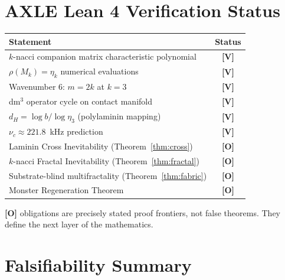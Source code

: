 \documentclass[12pt,a4paper]{article}
\newcommand{\etak}{\eta_k}
\newcommand{\etatrib}{\eta_3}
\begin{document}
\section{AXLE Lean 4 Verification Status}
\label{sec:axle}

\begin{center}
\begin{tabular}{lc}
\toprule
Statement & Status \\
\midrule
$k$-nacci companion matrix characteristic polynomial & \textbf{[V]}\\
$\rho(M_k)=\etak$ numerical evaluations & \textbf{[V]}\\
Wavenumber 6: $m=2k$ at $k=3$ & \textbf{[V]}\\
dm$^3$ operator cycle on contact manifold & \textbf{[V]}\\
$d_H=\log b/\log\etatrib$ (polylaminin mapping) & \textbf{[V]}\\
$\nu_c\approx 221.8$~kHz prediction & \textbf{[V]}\\
Laminin Cross Inevitability (Theorem~\ref{thm:cross}) & \textbf{[O]}\\
$k$-nacci Fractal Inevitability (Theorem~\ref{thm:fractal}) & \textbf{[O]}\\
Substrate-blind multifractality (Theorem~\ref{thm:fabric}) & \textbf{[O]}\\
Monster Regeneration Theorem & \textbf{[O]}\\
\bottomrule
\end{tabular}
\end{center}

\noindent\textbf{[O]} obligations are precisely stated proof frontiers,
not false theorems. They define the next layer of the mathematics.


\section{Falsifiability Summary}
\label{sec:falsifiability}
\end{document}
